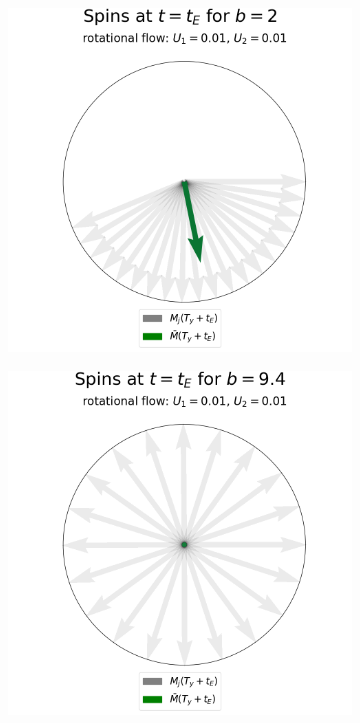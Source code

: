 \begin{figure}
\begin{subfigure}{0.4\textwidth}
                    \caption{}
                    \label{fig:mri-rotational:b}
                \end{subfigure}
                \begin{subfigure}{0.4\textwidth}
                    \centering
                    \includegraphics[width=\textwidth]{diagrams/results-mri/simple-tests/mri-spins_avg_2D_rotational_test_4.png}
                    \caption{}
                    \label{fig:mri-rotational:spins}
                \end{subfigure}
                \begin{subfigure}{0.4\textwidth}
                    \centering
                    \includegraphics[width=\textwidth]{diagrams/results-mri/simple-tests/mri-spins_avg_2D_rotational_test_4_b9.4.png}

\end{subfigure}
\end{figure}
